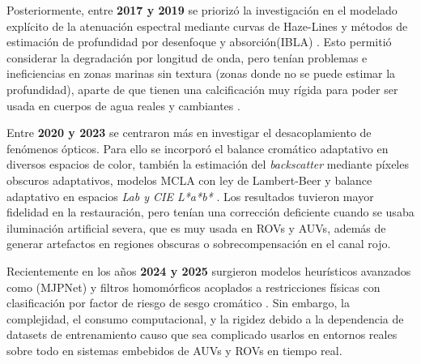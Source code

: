\documentclass[12pt,letterpaper,spanish,twoside,openright]{report}
\begin{document}
Posteriormente, entre \textbf{2017 y 2019} se priorizó la investigación en el modelado explícito de la atenuación espectral mediante curvas de Haze-Lines y métodos de estimación de profundidad por desenfoque y absorción(IBLA) \parencite{rs15194699} \parencite{Ke_2023}. Esto permitió considerar la degradación por longitud de onda, pero tenían problemas e ineficiencias en zonas marinas sin textura (zonas donde no se puede estimar la profundidad), aparte de que tienen una calcificación muy rígida para poder ser usada en cuerpos de agua reales y cambiantes \parencite{Ke_2023} \parencite{9020130}.

Entre \textbf{2020 y 2023} se centraron más en investigar el desacoplamiento de fenómenos ópticos. Para ello se incorporó el balance cromático adaptativo en diversos espacios de color, también la estimación del \textit{backscatter} mediante píxeles obscuros adaptativos, modelos MCLA con ley de Lambert-Beer \parencite{10216333} y balance adaptativo en espacios \textit{Lab y CIE L*a*b*} \parencite{rs15194699}. Los resultados tuvieron mayor fidelidad en la restauración, pero tenían una corrección deficiente cuando se usaba iluminación artificial severa, que es muy usada en ROVs y AUVs, además de generar artefactos en regiones obscuras o sobrecompensación en el canal rojo.


Recientemente en los años \textbf{2024 y 2025} surgieron modelos heurísticos avanzados como (MJPNet) \parencite{10798483} y filtros homomórficos acoplados a restricciones físicas con clasificación por factor de riesgo de sesgo cromático \parencite{ZHANG2025108826}. Sin embargo, la complejidad, el consumo computacional, y la rigidez debido a  la dependencia de datasets de entrenamiento causo que sea complicado usarlos en entornos reales sobre todo en sistemas embebidos de AUVs y ROVs en tiempo real.
\end{document}
